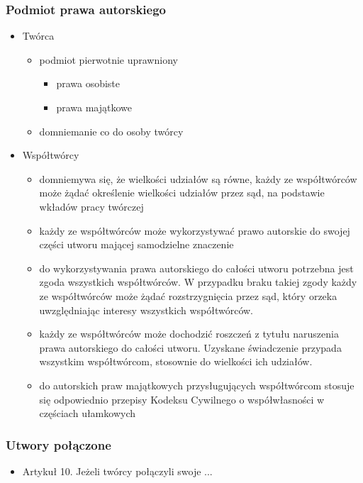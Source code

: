 \documentclass[12pt,a4paper]{article}
\begin{document}
\subsubsection{Podmiot prawa autorskiego}
\begin{itemize}
\item Twórca
	\begin{itemize}
	\item podmiot pierwotnie uprawniony
		\begin{itemize}
			\item prawa osobiste
			\item prawa majątkowe
		\end{itemize}
	\item domniemanie co do osoby twórcy
	\end{itemize}
\item Współtwórcy 
	\begin{itemize}
	\item domniemywa się, że wielkości udziałów są równe, każdy ze współtwórców może żądać określenie wielkości udziałów przez sąd, na podstawie wkładów pracy twórczej
	\item każdy ze współtwórców może wykorzystywać prawo autorskie do swojej części utworu mającej samodzielne znaczenie
	\item do wykorzystywania prawa autorskiego  do całości utworu potrzebna jest zgoda wszystkich współtwórców. W przypadku braku takiej zgody każdy ze współtwórców może żądać rozstrzygnięcia przez sąd, który orzeka uwzględniając interesy wszystkich współtwórców.
	\item każdy ze współtwórców może dochodzić roszczeń z tytułu naruszenia prawa autorskiego do całości utworu. Uzyskane świadczenie przypada wszystkim współtwórcom, stosownie do wielkości ich udziałów.
	\item do autorskich praw majątkowych przysługujących współtwórcom stosuje się odpowiednio przepisy Kodeksu Cywilnego o współwłasności w częściach ułamkowych
	\end{itemize}
\end{itemize}
\subsubsection{Utwory połączone}
\begin{itemize}
\item Artykuł 10. Jeżeli twórcy połączyli swoje ...
\end{itemize}
\end{document}
